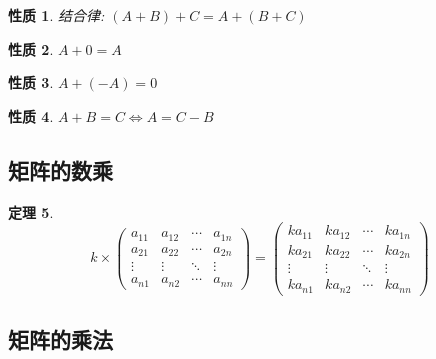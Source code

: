 \documentclass[12pt, a4paper, oneside]{ctexbook}
\newtheorem{theorem}{定理}[section]
\newtheorem{quolity}[theorem]{性质}
\begin{document}
\begin{quolity}
    结合律: $(A + B) + C = A + (B + C)$
\end{quolity}

\begin{quolity}
    $A + 0 = A$
\end{quolity}

\begin{quolity}
    $A + (-A) = 0$
\end{quolity}

\begin{quolity}
    $A + B = C \Leftrightarrow A = C - B$
\end{quolity}

\subsection{矩阵的数乘}

\begin{theorem}
    $$k \times \left ( \begin{matrix}
        a_{11} & a_{12} & \cdots & a_{1n} \\
        a_{21} & a_{22} & \cdots & a_{2n} \\
        \vdots & \vdots & \ddots & \vdots \\
        a_{n1} & a_{n2} & \cdots & a_{nn}
    \end{matrix} \right ) = \left ( \begin{matrix}
        ka_{11} & ka_{12} & \cdots & ka_{1n} \\
        ka_{21} & ka_{22} & \cdots & ka_{2n} \\
        \vdots & \vdots & \ddots & \vdots \\
        ka_{n1} & ka_{n2} & \cdots & ka_{nn}
    \end{matrix} \right )$$
\end{theorem}

\subsection{矩阵的乘法}
\end{document}
